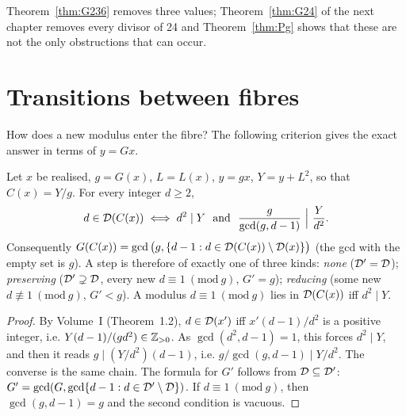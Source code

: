 Theorem~\ref{thm:G236} removes three values; Theorem~\ref{thm:G24} of the next chapter removes every divisor of 24 and Theorem~\ref{thm:Pg} shows that these are not the only obstructions that can occur.

\section{Transitions between fibres}

How does a new modulus enter the fibre? The following criterion gives the exact answer in terms of \(y=Gx\).

\begin{theorem}\label{thm:transition}
Let \(x\) be realised, \(g=G(x)\), \(L=L(x)\), \(y=gx\), \(Y=y+L^2\), so that \(C(x)=Y/g\). For every integer \(d\ge2\),
\[
d\in\Dx(C(x))\iff d^2\mid Y\ \text{ and }\ \frac{g}{\gcd(g,d-1)}\ \Big|\ \frac{Y}{d^2}.
\]
Consequently \(G(C(x))=\gcd\big(g,\{d-1:d\in\mathcal{D}(C(x))\setminus\mathcal{D}(x)\}\big)\) (the gcd with the empty set is \(g\)). A step is therefore of exactly one of three kinds: \emph{none} (\(\mathcal{D}'=\mathcal{D}\)); \emph{preserving} (\(\mathcal{D}'\supsetneq\mathcal{D}\), every new \(d\equiv1\ (\mathrm{mod}\ g)\), \(G'=g\)); \emph{reducing} (some new \(d\not\equiv1\ (\mathrm{mod}\ g)\), \(G'<g\)). A modulus \(d\equiv1\ (\mathrm{mod}\ g)\) lies in \(\mathcal{D}(C(x))\) iff \(d^2\mid Y\).
\end{theorem}
\begin{proof}
By Volume~I (Theorem~1.2), \(d\in\mathcal{D}(x')\) iff \(x'(d-1)/d^2\) is a positive integer, i.e. \(Y(d-1)/(gd^2)\in\mathbb{Z}_{>0}\). As \(\gcd(d^2,d-1)=1\), this forces \(d^2\mid Y\), and then it reads \(g\mid(Y/d^2)(d-1)\), i.e. \(g/\gcd(g,d-1)\mid Y/d^2\). The converse is the same chain. The formula for \(G'\) follows from \(\mathcal{D}\subseteq\mathcal{D}'\): \(G'=\gcd(G,\gcd\{d-1:d\in\mathcal{D}'\setminus\mathcal{D}\})\). If \(d\equiv1\ (\mathrm{mod}\ g)\), then \(\gcd(g,d-1)=g\) and the second condition is vacuous.
\end{proof}

